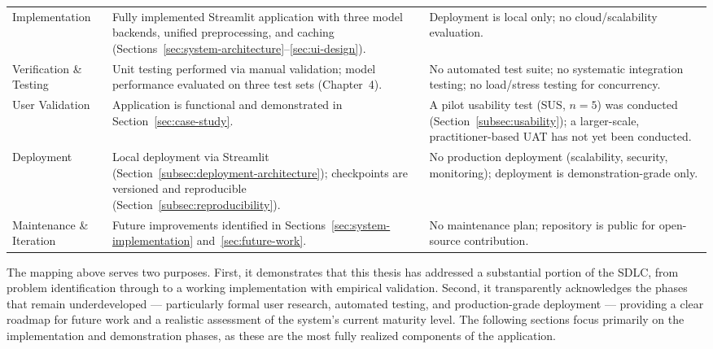\documentclass[12pt]{report} %
\begin{document}
\begin{table}[H]
\begin{tabular}{p{2.8cm}p{4.5cm}p{4.2cm}}
        Implementation           & Fully implemented Streamlit application with three model backends, unified preprocessing, and caching (Sections~\ref{sec:system-architecture}--\ref{sec:ui-design}).  & Deployment is local only; no cloud/scalability evaluation.                                                                                             \\
        Verification \& Testing  & Unit testing performed via manual validation; model performance evaluated on three test sets (Chapter~4).                                                             & No automated test suite; no systematic integration testing; no load/stress testing for concurrency.                                                    \\
        User Validation          & Application is functional and demonstrated in Section~\ref{sec:case-study}.                                                                                           & A pilot usability test (SUS, $n=5$) was conducted (Section~\ref{subsec:usability}); a larger-scale, practitioner-based UAT has not yet been conducted. \\
        Deployment               & Local deployment via Streamlit (Section~\ref{subsec:deployment-architecture}); checkpoints are versioned and reproducible (Section~\ref{subsec:reproducibility}).     & No production deployment (scalability, security, monitoring); deployment is demonstration-grade only.                                                  \\
        Maintenance \& Iteration & Future improvements identified in Sections~\ref{sec:system-implementation} and~\ref{sec:future-work}.                                                                 & No maintenance plan; repository is public for open-source contribution.                                                                                \\
        \hline
    \end{tabular}
\end{table}

The mapping above serves two purposes. First, it demonstrates that this thesis has addressed a substantial portion of the SDLC, from problem identification through to a working implementation with empirical validation. Second, it transparently acknowledges the phases that remain underdeveloped --- particularly formal user research, automated testing, and production-grade deployment --- providing a clear roadmap for future work and a realistic assessment of the system's current maturity level. The following sections focus primarily on the implementation and demonstration phases, as these are the most fully realized components of the application.
\end{document}
